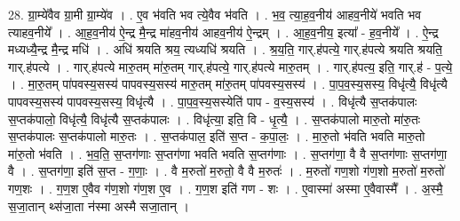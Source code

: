 \documentclass[17pt]{extarticle}
\begin{document}
28. ग्रा॒म्ये॑वैव ग्रा॒मी ग्रा॒म्ये॑व । . ए॒व भ॑वति भव त्ये॒वैव भ॑वति । . भ॒व॒ त्या॒ह॒व॒नीय॑ आहव॒नीये॑ भवति भव त्याहव॒नीये᳚ । . आ॒ह॒व॒नीय॑ ऐ॒न्द्र मै॒न्द्र मा॑हव॒नीय॑ आहव॒नीय॑ ऐ॒न्द्रम् । . आ॒ह॒व॒नीय॒ इत्या᳚ - ह॒व॒नीये᳚ । . ऐ॒न्द्र मध्यध्यै॒न्द्र मै॒न्द्र मधि॑ । . अधि॑ श्रयति श्रय॒ त्यध्यधि॑ श्रयति । . श्र॒य॒ति॒ गार्.ह॑पत्ये॒ गार्.ह॑पत्ये श्रयति श्रयति॒ गार्.ह॑पत्ये । . गार्.ह॑पत्ये मारु॒तम् मा॑रु॒तम् गार्.ह॑पत्ये॒ गार्.ह॑पत्ये मारु॒तम् । . गार्.ह॑पत्य॒ इति॒ गार्.ह॑ - प॒त्ये॒ । . मा॒रु॒तम् पा॑पवस्य॒सस्य॑ पापवस्य॒सस्य॑ मारु॒तम् मा॑रु॒तम् पा॑पवस्य॒सस्य॑ । . पा॒प॒व॒स्य॒सस्य॒ विधृ॑त्यै॒ विधृ॑त्यै पापवस्य॒सस्य॑ पापवस्य॒सस्य॒ विधृ॑त्यै । . पा॒प॒व॒स्य॒सस्येति॑ पाप - व॒स्य॒सस्य॑ । . विधृ॑त्यै स॒प्तक॑पालः स॒प्तक॑पालो॒ विधृ॑त्यै॒ विधृ॑त्यै स॒प्तक॑पालः । . विधृ॑त्या॒ इति॒ वि - धृ॒त्यै॒ । . स॒प्तक॑पालो मारु॒तो मा॑रु॒तः स॒प्तक॑पालः स॒प्तक॑पालो मारु॒तः । . स॒प्तक॑पाल॒ इति॑ स॒प्त - क॒पा॒लः॒ । . मा॒रु॒तो भ॑वति भवति मारु॒तो मा॑रु॒तो भ॑वति । . भ॒व॒ति॒ स॒प्तग॑णाः स॒प्तग॑णा भवति भवति स॒प्तग॑णाः । . स॒प्तग॑णा॒ वै वै स॒प्तग॑णाः स॒प्तग॑णा॒ वै । . स॒प्तग॑णा॒ इति॑ स॒प्त - ग॒णाः॒ । . वै म॒रुतो॑ म॒रुतो॒ वै वै म॒रुतः॑ । . म॒रुतो॑ गण॒शो ग॑ण॒शो म॒रुतो॑ म॒रुतो॑ गण॒शः । . ग॒ण॒श ए॒वैव ग॑ण॒शो ग॑ण॒श ए॒व । . ग॒ण॒श इति॑ गण - शः । . ए॒वास्मा॑ अस्मा ए॒वैवास्मै᳚ । . अ॒स्मै॒ स॒जा॒तान् थ्स॑जा॒ता न॑स्मा अस्मै सजा॒तान् । \newline
\end{document}
